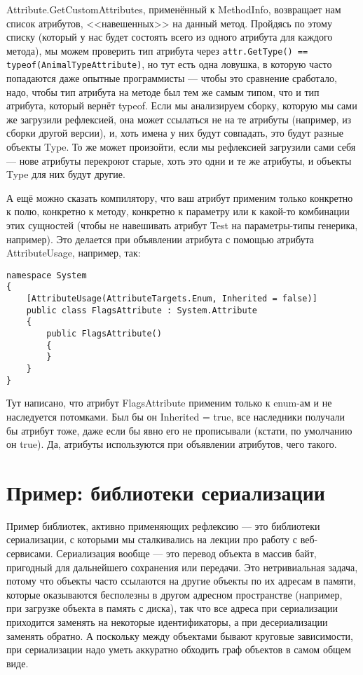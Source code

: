 \documentclass{../../text-style}
\begin{document}
Attribute.GetCustomAttributes, применённый к MethodInfo, возвращает нам список атрибутов, <<навешенных>> на данный метод. Пройдясь по этому списку (который у нас будет состоять всего из одного атрибута для каждого метода), мы можем проверить тип атрибута через \texttt{attr.GetType() == typeof(AnimalTypeAttribute)}, но тут есть одна ловушка, в которую часто попадаются даже опытные программисты --- чтобы это сравнение сработало, надо, чтобы тип атрибута на методе был тем же самым типом, что и тип атрибута, который вернёт typeof. Если мы анализируем сборку, которую мы сами же загрузили рефлексией, она может ссылаться не на те атрибуты (например, из сборки другой версии), и, хоть имена у них будут совпадать, это будут разные объекты Type. То же может произойти, если мы рефлексией загрузили сами себя --- нове атрибуты перекроют старые, хоть это одни и те же атрибуты, и объекты Type для них будут другие.

А ещё можно сказать компилятору, что ваш атрибут применим только конкретно к полю, конкретно к методу, конкретно к параметру или к какой-то комбинации этих сущностей (чтобы не навешивать атрибут Test на параметры-типы генерика, например). Это делается при объявлении атрибута с помощью атрибута AttributeUsage, например, так:

\begin{verbatim}
namespace System 
{
    [AttributeUsage(AttributeTargets.Enum, Inherited = false)]
    public class FlagsAttribute : System.Attribute
    {
        public FlagsAttribute()
        {
        }
    }
}
\end{verbatim}

Тут написано, что атрибут FlagsAttribute применим только к enum-ам и не наследуется потомками. Был бы он Inherited = true, все наследники получали бы атрибут тоже, даже если бы явно его не прописывали (кстати, по умолчанию он true). Да, атрибуты используются при объявлении атрибутов, чего такого.

\section{Пример: библиотеки сериализации}

Пример библиотек, активно применяющих рефлексию --- это библиотеки сериализации, с которыми мы сталкивались на лекции про работу с веб-сервисами. Сериализация вообще --- это перевод объекта в массив байт, пригодный для дальнейшего сохранения или передачи. Это нетривиальная задача, потому что объекты часто ссылаются на другие объекты по их адресам в памяти, которые оказываются бесполезны в другом адресном пространстве (например, при загрузке объекта в память с диска), так что все адреса при сериализации приходится заменять на некоторые идентификаторы, а при десериализации заменять обратно. А поскольку между объектами бывают круговые зависимости, при сериализации надо уметь аккуратно обходить граф объектов в самом общем виде.
\end{document}
